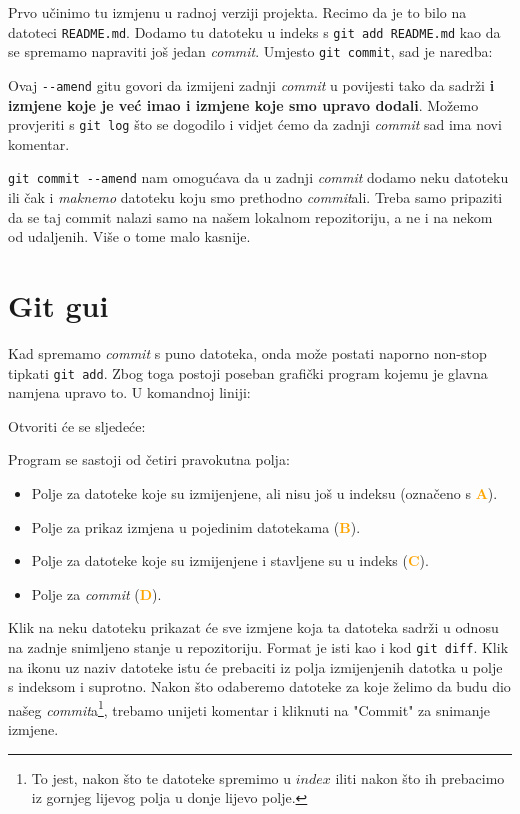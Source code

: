 Prvo učinimo tu izmjenu u radnoj verziji projekta. 
Recimo da je to bilo na datoteci \verb+README.md+.
Dodamo tu datoteku u indeks s \verb+git add README.md+ kao da se spremamo napraviti još jedan \emph{commit}.
Umjesto \verb+git commit+, sad je naredba:


Ovaj \verb+--amend+ gitu govori da izmijeni zadnji \emph{commit} u povijesti tako da sadrži \textbf{i izmjene koje je već imao i izmjene koje smo upravo dodali}.
Možemo provjeriti s \verb+git log+ što se dogodilo i vidjet ćemo da zadnji \emph{commit} sad ima novi komentar.

\verb+git commit --amend+ nam omogućava da u zadnji \emph{commit} dodamo neku datoteku ili čak i \emph{maknemo} datoteku koju smo prethodno \emph{commit}ali. 
Treba samo pripaziti da se taj commit nalazi samo na našem lokalnom repozitoriju, a ne i na nekom od udaljenih. 
Više o tome malo kasnije.

\section*{Git gui}

Kad spremamo \emph{commit} s puno datoteka, onda može postati naporno non-stop tipkati \verb+git add+.
Zbog toga postoji poseban grafički program kojemu je glavna namjena upravo to.
U komandnoj liniji:


Otvoriti će se sljedeće:


Program se sastoji od četiri pravokutna polja:

\begin{itemize}
	\item Polje za datoteke koje su izmijenjene, ali nisu još u indeksu (označeno s \textcolor{orange}{\textbf{A}}).
	\item Polje za prikaz izmjena u pojedinim datotekama (\textcolor{orange}{\textbf{B}}). 
	\item Polje za datoteke koje su izmijenjene i stavljene su u indeks (\textcolor{orange}{\textbf{C}}).
	\item Polje za \emph{commit} (\textcolor{orange}{\textbf{D}}).
\end{itemize}

Klik na neku datoteku prikazat će sve izmjene koja ta datoteka sadrži u odnosu na zadnje snimljeno stanje u repozitoriju.
Format je isti kao i kod \verb+git diff+.
Klik na ikonu uz naziv datoteke istu će prebaciti iz polja izmijenjenih datotka u polje s indeksom i suprotno.
Nakon što odaberemo datoteke za koje želimo da budu dio našeg \emph{commit}a\footnote{To jest, nakon što te datoteke spremimo u $index$ iliti nakon što ih prebacimo iz gornjeg lijevog polja u donje lijevo polje.}, trebamo unijeti komentar i kliknuti na "Commit" za snimanje izmjene.


